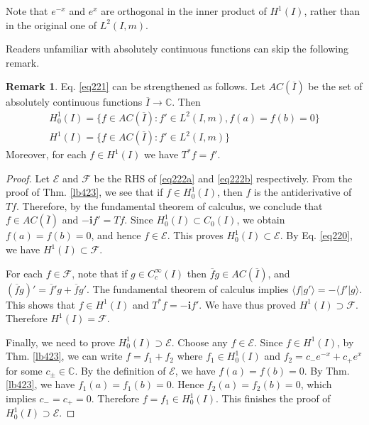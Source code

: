 \documentclass[12pt,b5paper,notitlepage]{article}
\theoremstyle{definition}
\newtheorem{rem}[df]{Remark}
\theoremstyle{plain}
\newcommand{\mc}{\mathcal}
\newcommand{\ovl}{\overline}
\newcommand{\bk}[1]{\langle {#1}\rangle}
\newcommand{\im}{\mathbf{i}}
\newcommand{\Cbb}{\mathbb C}
\numberwithin{equation}{section}
\begin{document}
Note that $e^{-x}$ and $e^x$ are orthogonal in the inner product of $H^1(I)$, rather than in the original one of $L^2(I,m)$.

Readers unfamiliar with absolutely continuous functions can skip the following remark.


\begin{rem}\label{lb463}
Eq. \eqref{eq221} can be strengthened as follows. Let $AC(\ovl I)$ be the set of absolutely continuous functions $\ovl I\rightarrow\Cbb$. Then
\begin{subequations}\label{eq222}
\begin{gather}
H^1_0(I)=\{f\in AC(\ovl I):f'\in L^2(I,m),f(a)=f(b)=0\}\label{eq222a}\\
H^1(I)=\{f\in AC(\ovl I):f'\in L^2(I,m)\}\label{eq222b}
\end{gather} 
\end{subequations}
Moreover, for each $f\in H^1(I)$ we have $T^*f=f'$.
\end{rem}

\begin{proof}
Let $\mc E$ and $\mc F$ be the RHS of \eqref{eq222a} and \eqref{eq222b} respectively. From the proof of Thm. \ref{lb423}, we see that if $f\in H^1_0(I)$, then $f$ is the antiderivative of $Tf$. Therefore, by the fundamental theorem of calculus, we conclude that $f\in AC(\ovl I)$ and $-\im f'=Tf$. Since $H^1_0(I)\subset C_0(I)$, we obtain $f(a)=f(b)=0$, and hence $f\in\mc E$. This proves $H^1_0(I)\subset\mc E$. By Eq. \eqref{eq220}, we have $H^1(I)\subset\mc F$.

For each $f\in\mc F$, note that if $g\in C_c^\infty(I)$ then $\ovl fg\in AC(\ovl I)$, and $(\ovl fg)'=\ovl f'g+\ovl fg'$. The fundamental theorem of calculus implies $\bk{f|g'}=-\bk{f'|g}$. This shows that $f\in H^1(I)$ and $T^*f=-\im f'$. We have thus proved $H^1(I)\supset \mc F$. Therefore $H^1(I)=\mc F$.

Finally, we need to prove $H^1_0(I)\supset\mc E$. Choose any $f\in\mc E$. Since $f\in H^1(I)$, by Thm. \ref{lb423}, we can write $f=f_1+f_2$ where $f_1\in H^1_0(I)$ and $f_2=c_-e^{-x}+c_+e^x$ for some $c_\pm\in\Cbb$. By the definition of $\mc E$, we have $f(a)=f(b)=0$. By Thm. \ref{lb423}, we have $f_1(a)=f_1(b)=0$. Hence $f_2(a)=f_2(b)=0$, which implies $c_-=c_+=0$. Therefore $f=f_1\in H^1_0(I)$. This finishes the proof of $H^1_0(I)\supset\mc E$.
\end{proof}
\end{document}
